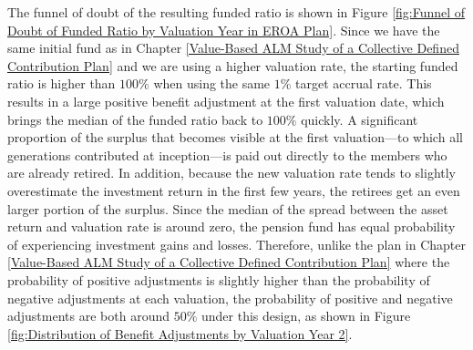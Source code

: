 \documentclass{sfuthesis}
\numberwithin{equation}{chapter}
\begin{document}
		The funnel of doubt of the resulting funded ratio is shown in Figure \ref{fig:Funnel of Doubt of Funded Ratio by Valuation Year in EROA Plan}. Since we have the same initial fund as in Chapter \ref{Value-Based ALM Study of a Collective Defined Contribution Plan} and we are using a higher valuation rate, the starting funded ratio is higher than $100\%$ when using the same $1\%$ target accrual rate. This results in a large positive benefit adjustment at the first valuation date, which brings the median of the funded ratio back to $100\%$ quickly. A significant proportion of the surplus that becomes visible at the first valuation---to which all generations contributed at inception---is paid out directly to the members who are already retired. In addition, because the new valuation rate tends to slightly overestimate the investment return in the first few years, the retirees get an even larger portion of the surplus. Since the median of the spread between the asset return and valuation rate is around zero, the pension fund has equal probability of experiencing investment gains and losses. Therefore, unlike the plan in Chapter \ref{Value-Based ALM Study of a Collective Defined Contribution Plan} where the probability of positive adjustments is slightly higher than the probability of negative adjustments at each valuation, the probability of positive and negative adjustments are both around $50\%$ under this design, as shown in Figure \ref{fig:Distribution of Benefit Adjustments by Valuation Year 2}. 
	
\end{document}
